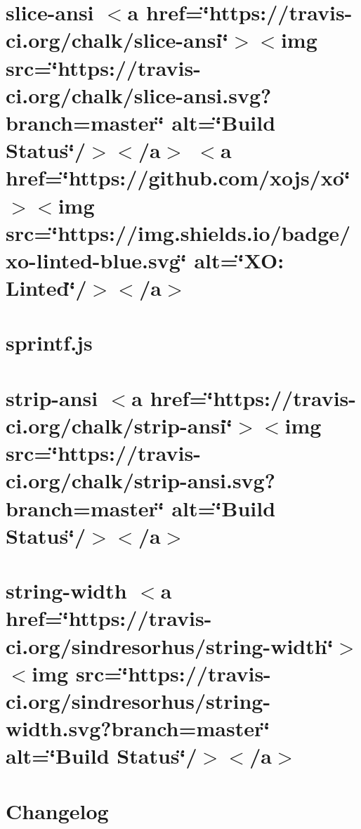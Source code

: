 \let\mypdfximage\pdfximage\def\pdfximage{\immediate\mypdfximage}\documentclass[twoside]{book}
\newcommand{\+}{\discretionary{\mbox{\scriptsize$\hookleftarrow$}}{}{}}
\begin{document}
\chapter{slice-\/ansi $<$a href=\char`\"{}https\+://travis-\/ci.\+org/chalk/slice-\/ansi\char`\"{}$>$$<$img src=\char`\"{}https\+://travis-\/ci.\+org/chalk/slice-\/ansi.\+svg?branch=master\char`\"{} alt=\char`\"{}\+Build Status\char`\"{}/$>$$<$/a$>$ $<$a href=\char`\"{}https\+://github.\+com/xojs/xo\char`\"{}$>$$<$img src=\char`\"{}https\+://img.\+shields.\+io/badge/xo-\/linted-\/blue.\+svg\char`\"{} alt=\char`\"{}\+X\+O\+: Linted\char`\"{}/$>$$<$/a$>$}
\label{md_heap-visualizer_node_modules_slice-ansi_readme}

\chapter{sprintf.\+js}
\label{md_heap-visualizer_node_modules_sprintf-js__r_e_a_d_m_e}

\chapter{strip-\/ansi $<$a href=\char`\"{}https\+://travis-\/ci.\+org/chalk/strip-\/ansi\char`\"{}$>$$<$img src=\char`\"{}https\+://travis-\/ci.\+org/chalk/strip-\/ansi.\+svg?branch=master\char`\"{} alt=\char`\"{}\+Build Status\char`\"{}/$>$$<$/a$>$}
\label{md_heap-visualizer_node_modules_string-width_node_modules_strip-ansi_readme}

\chapter{string-\/width $<$a href=\char`\"{}https\+://travis-\/ci.\+org/sindresorhus/string-\/width\char`\"{}$>$$<$img src=\char`\"{}https\+://travis-\/ci.\+org/sindresorhus/string-\/width.\+svg?branch=master\char`\"{} alt=\char`\"{}\+Build Status\char`\"{}/$>$$<$/a$>$}
\label{md_heap-visualizer_node_modules_string-width_readme}

\chapter{Changelog}
\label{md_heap-visualizer_node_modules_string_8prototype_8trimend__c_h_a_n_g_e_l_o_g}

\end{document}
